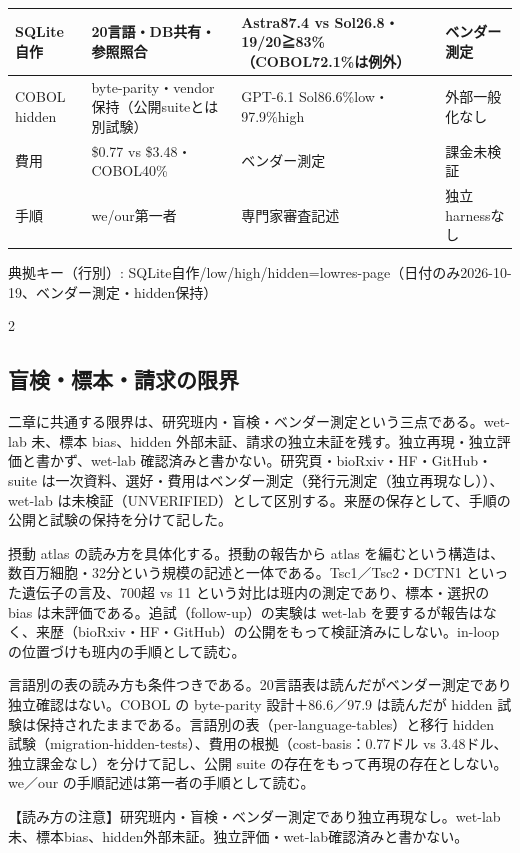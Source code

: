 \documentclass[lualatex,a4paper,10pt]{jlreq}
\begin{document}
{\centering\footnotesize
{}
\begin{tabularx}{0.96\linewidth}{@{}lXXX@{}}
\toprule
SQLite自作 & 20言語・DB共有・参照照合 & Astra87.4 vs Sol26.8・19/20≧83\%（COBOL72.1\%は例外） & ベンダー測定 \\
\midrule
COBOL hidden & byte-parity・vendor保持（公開suiteとは別試験） & GPT-6.1 Sol86.6\%low・97.9\%high & 外部一般化なし \\
費用 & \$0.77 vs \$3.48・COBOL40\% & ベンダー測定 & 課金未検証 \\
手順 & we/our第一者 & 専門家審査記述 & 独立harnessなし \\
\bottomrule
\end{tabularx}
{\scriptsize\color{SurveyMuted} 典拠キー（行別）: SQLite自作/low/high/hidden=lowres-page（日付のみ2026-10-19、ベンダー測定・hidden保持）\par}
} %
\begin{multicols}{2} %


\subsection*{盲検・標本・請求の限界}


二章に共通する限界は、研究班内・盲検・ベンダー測定という三点である。wet-lab 未、標本 bias、hidden 外部未証、請求の独立未証を残す。独立再現・独立評価と書かず、wet-lab 確認済みと書かない。研究頁・bioRxiv・HF・GitHub・suite は一次資料、選好・費用はベンダー測定（発行元測定（独立再現なし））、wet-lab は未検証（UNVERIFIED）として区別する。来歴の保存として、手順の公開と試験の保持を分けて記した。


摂動 atlas の読み方を具体化する。摂動の報告から atlas を編むという構造は、数百万細胞・32分という規模の記述と一体である。Tsc1／Tsc2・DCTN1 といった遺伝子の言及、700超 vs 11 という対比は班内の測定であり、標本・選択の bias は未評価である。追試（follow-up）の実験は wet-lab を要するが報告はなく、来歴（bioRxiv・HF・GitHub）の公開をもって検証済みにしない。in-loop の位置づけも班内の手順として読む。


言語別の表の読み方も条件つきである。20言語表は読んだがベンダー測定であり独立確認はない。COBOL の byte-parity 設計＋86.6／97.9 は読んだが hidden 試験は保持されたままである。言語別の表（per-language-tables）と移行 hidden 試験（migration-hidden-tests）、費用の根拠（cost-basis：0.77ドル vs 3.48ドル、独立課金なし）を分けて記し、公開 suite の存在をもって再現の存在としない。we／our の手順記述は第一者の手順として読む。


\begin{tcolorbox}[colback=SurveySoft,colframe=SurveyRule,arc=1mm,boxrule=0.4pt,left=2mm,right=2mm]
【読み方の注意】研究班内・盲検・ベンダー測定であり独立再現なし。wet-lab未、標本bias、hidden外部未証。独立評価・wet-lab確認済みと書かない。

\end{tcolorbox}


\end{multicols} %
\end{document}
